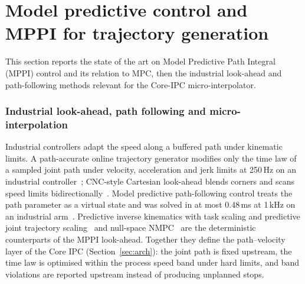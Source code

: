 \section{Model predictive control and MPPI for trajectory generation}\label{sec:mpc}

This section reports the state of the art on Model Predictive Path Integral (MPPI) control and its relation to MPC, then the industrial look-ahead and path-following methods relevant for the Core-IPC micro-interpolator.

\begingroup
\let\section\subsection
\let\subsection\subsubsection
\renewcommand{\paragraph}[1]{\par\runin{#1}}

\endgroup

\subsection{Industrial look-ahead, path following and micro-interpolation}
Industrial controllers adapt the speed along a buffered path under kinematic limits. A path-accurate online trajectory generator modifies only the time law of a sampled joint path under velocity, acceleration and jerk limits at 250\,Hz on an industrial controller~\cite{lange2016pathaccurate}; CNC-style Cartesian look-ahead blends corners and scans speed limits bidirectionally~\cite{ma2025lookahead}. Model predictive path-following control treats the path parameter as a virtual state and was solved in at most 0.48\,ms at 1\,kHz on an industrial arm~\cite{faulwasser2017pathfollowing}. Predictive inverse kinematics with task scaling and predictive joint trajectory scaling~\cite{faroni2019pik,faroni2020scaling} and null-space NMPC~\cite{sun2024nullspacempc} are the deterministic counterparts of the MPPI look-ahead. Together they define the path--velocity layer of the Core IPC (Section~\ref{sec:arch}): the joint path is fixed upstream, the time law is optimised within the process speed band under hard limits, and band violations are reported upstream instead of producing unplanned stops.
